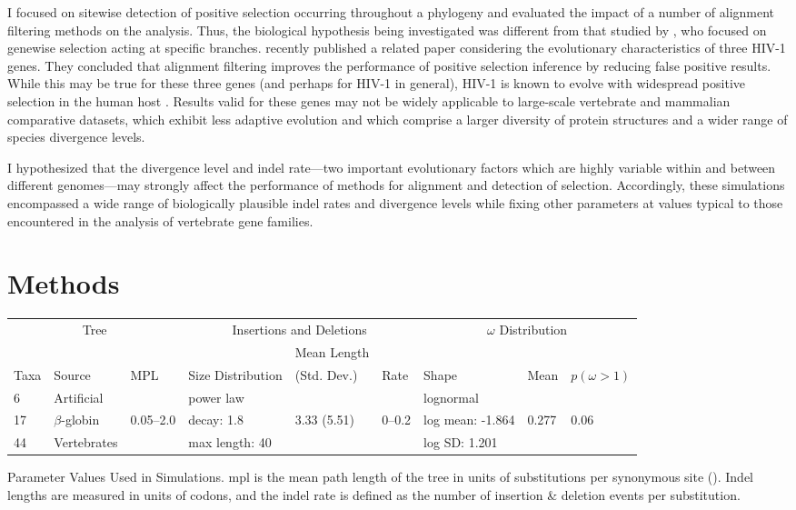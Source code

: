 I focused on sitewise detection of positive selection occurring
throughout a phylogeny and evaluated the impact of a number of
alignment filtering methods on the \sw analysis. Thus, the biological
hypothesis being investigated was different from that studied by
\citet{Fletcher2010}, who focused on genewise selection acting at
specific branches.  \citet{Privman2011Improving} recently published a
related paper considering the evolutionary characteristics of three
HIV-1 genes. They concluded that alignment filtering improves the
performance of positive selection inference by reducing false positive
results. While this may be true for these three genes (and perhaps for
HIV-1 in general), HIV-1 is known to evolve with widespread positive
selection in the human host \citep{Yang2003Widespread}. Results valid
for these genes may not be widely applicable to large-scale vertebrate
and mammalian comparative datasets, which exhibit less adaptive
evolution \citep{Kosiol2008} and which comprise a larger diversity of
protein structures and a wider range of species divergence levels.

I hypothesized that the divergence level and indel rate---two important
evolutionary factors which are highly variable within and between
different genomes---may strongly affect the performance of methods for
alignment and detection of selection. Accordingly, these simulations
encompassed a wide range of biologically plausible indel rates and
divergence levels while fixing other parameters at values typical to
those encountered in the \sw analysis of vertebrate gene families.

\section{Methods}

\bbtable
\centering
\begin{tabular}{lllllllll}
\toprule
 \multicolumn{3}{c}{Tree} & \multicolumn{3}{c}{Insertions and Deletions} & \multicolumn{3}{c}{$\omega$ Distribution} \\
\cmidrule(r){1-3} \cmidrule(r){4-6} \cmidrule(r){7-9}
 & & &  & Mean Length & & & & \\
Taxa & Source & MPL & Size Distribution & (Std. Dev.) & Rate & Shape & Mean & $p (\omega>1)$ \\
\midrule
6 & Artificial & & power law & & & lognormal & & \\
17 & $\beta$-globin & 0.05--2.0 & decay: 1.8 & 3.33 (5.51) & 0--0.2 & log mean: -1.864 & 0.277 & 0.06 \\
44 & Vertebrates & & max length: 40 & & &  log SD: 1.201 & & \\
\bottomrule
\end{tabular}
\caption{Parameter Values Used in Simulations. \ac{mpl} is the mean
  path length of the tree in units of substitutions per synonymous
  site (\ds). Indel lengths are measured in units of codons, and the
  indel rate is defined as the number of insertion \& deletion events
  per substitution.}
\label{table_indels_1}
\eetable

